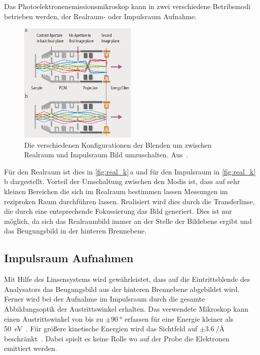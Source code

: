         Das Photoelektronenemissionsmikroskop kann in zwei verschiedene Betribsmodi betrieben werden, der Realraum- oder Impulsraum Aufnahme.
        \begin{figure}
            \centering
            \includegraphics[width=0.5\textwidth]{Real_k.PNG}
            \caption{Die verschiedenen Konfigurationen der Blenden um zwischen Realraum und Impulsraum Bild umzuschalten. Aus~\cite{Focus}.}
            \label{fig:real_k}
        \end{figure}
        Für den Realraum ist dies in \autoref{fig:real_k}\,a und für den Impulsraum in \autoref{fig:real_k}\,b dargestellt.
        Vorteil der Umschaltung zwischen den Modis ist, dass auf sehr kleinen Bereichen die sich im Realraum bestimmen lassen Messungen im reziproken Raum durchführen lassen.
        Realisiert wird dies durch die Transferlinse, die durch eine entsprechende Fokussierung das Bild generiert.
        Dies ist nur möglich, da sich das Realraumbild immer an der Stelle der Bildebene ergibt und das Beugungsbild in der hinteren Brennebene.
        

        \subsection{Impulsraum Aufnahmen}
            Mit Hilfe des Linsensystems wird gewährleistet, dass auf die Eintrittsblende des Analysators das Beugungsbild aus der hinteren Brennebene abgebildet wird.
            Ferner wird bei der Aufnahme im Impulsraum durch die gesamte Abbildungsoptik der Austrittswinkel erhalten.
            Das verwendete Mikroskop kann einen Austrittswinkel von bis zu $\pm\SI{90}{\degree}$ erfassen für eine Energie kleiner als \SI{50}{\electronvolt}~\cite{SPECS-MM}.
            Für größere kinetische Energien wird das Sichtfeld auf $\pm\SI[per-mode=reciprocal]{3.6}{\per\angstrom}$ beschränkt~\cite{SPECS-MM}.
            Dabei spielt es keine Rolle wo auf der Probe die Elektronen emittiert werden.

